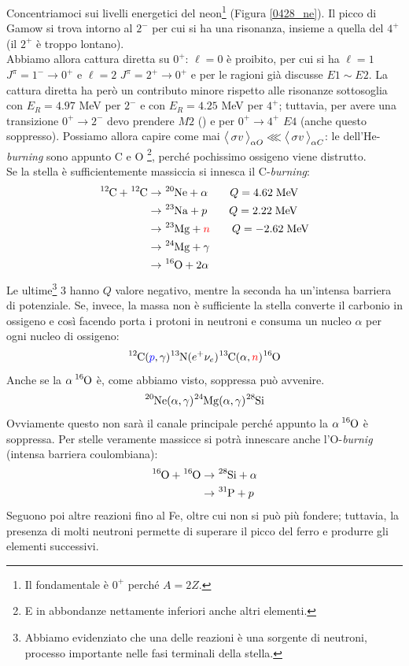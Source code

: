 \noindent Concentriamoci sui livelli energetici del neon\footnote{Il fondamentale è $0^+$ perché $A=2Z$.} (Figura \ref{0428_ne}). Il picco di Gamow si trova intorno al $2^-$ per cui si ha una risonanza, insieme a quella del $4^+$ (il $2^+$ è troppo lontano).\\
\noindent Abbiamo allora cattura diretta su $0^+$: $\ell=0$ è proibito, per cui si ha $\ell=1$ $J^\pi=1^-\to0^+$ e $\ell=2$ $J^\pi=2^+\to0^+$ e per le ragioni già discusse $E1\sim E2$. La cattura diretta ha però un contributo minore rispetto alle risonanze sottosoglia con $E_R =4.97$ MeV per $2^-$ e con $E_R =4.25$ MeV per $4^+$; tuttavia, per avere una transizione $0^+\to2^-$ devo prendere $M2$ () e per $0^+\to4^+$ $E4$ (anche questo soppresso). Possiamo allora capire come mai $\bigl\langle\, \sigma v\, \bigr\rangle_{\alpha O}\lll\bigl\langle\, \sigma v\, \bigr\rangle_{\alpha C}$: le  dell'He-\textit{burning} sono appunto C e O \footnote{E in abbondanze nettamente inferiori anche altri elementi.}, perché pochissimo ossigeno viene distrutto. \\ 
Se la stella è sufficientemente massiccia si innesca il C-\textit{burning}:
\begin{align*}
	\ce{^{12}C} +\ce{^{12}C} &\to \ce{^{20}Ne}+ \alpha \qquad Q=4.62 \unit{MeV} \\
	&\to \ce{^{23}Na}+ p \qquad Q=2.22 \unit{MeV} \\ 
	&\to \ce{^{23}Mg}+ \textcolor{red}{n} \qquad Q=-2.62 \unit{MeV} \\ 
	&\to \ce{^{24}Mg}+ \gamma \\ 
	&\to \ce{^{16}O}+ 2\alpha  
\end{align*}
Le ultime\footnote{Abbiamo evidenziato che una delle reazioni è una sorgente di neutroni, processo importante nelle fasi terminali della stella.} 3 hanno $Q$ valore negativo, mentre la seconda ha un'intensa barriera di potenziale. Se, invece, la massa non è sufficiente la stella converte il carbonio in ossigeno e così facendo porta i protoni in neutroni e consuma un nucleo $\alpha$ per ogni nucleo di ossigeno:
$$\ce{^{12}C}(\textcolor{blue}{p},\gamma)\ce{^{13}N}(e^+\nu_e)\ce{^{13}C}(\alpha,\textcolor{red}{n})\ce{^{16}O}$$
Anche se la $\alpha \, \ce{^{16}O}$ è, come abbiamo visto, soppressa può avvenire.
$$\ce{^{20}Ne}(\alpha,\gamma)\ce{^{24}Mg}(\alpha,\gamma)\ce{^{28}Si}$$
Ovviamente questo non sarà il canale principale perché appunto la $\alpha \, \ce{^{16}O}$ è soppressa. Per stelle veramente massicce si potrà innescare anche l'O-\textit{burnig} (intensa barriera coulombiana):
\begin{align*}
	\ce{^{16}O} + \ce{^{16}O} &\to \ce{^{28}Si} +\alpha \\
	&\to \ce{^{31}P} + p
\end{align*}
Seguono poi altre reazioni fino al Fe, oltre cui non si può più fondere; tuttavia, la presenza di molti neutroni permette di superare il picco del ferro e produrre gli elementi successivi.


